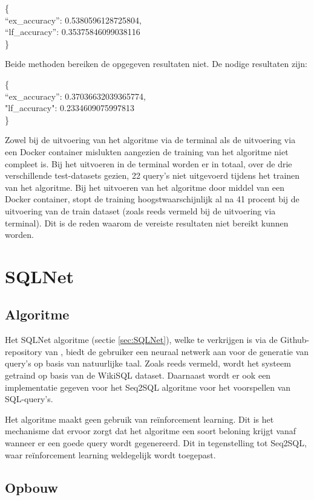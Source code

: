 \{ \\
“ex\_accuracy”: 0.5380596128725804, \\
“lf\_accuracy”: 0.35375846099038116 \\
\}

Beide methoden bereiken de opgegeven resultaten niet. De nodige resultaten zijn:

\{ \\
“ex\_accuracy”: 0.37036632039365774, \\
"lf\_accuracy": 0.2334609075997813 \\
\}

Zowel bij de uitvoering van het algoritme via de terminal als de uitvoering via een Docker container mislukten aangezien de training van het algoritme niet compleet is. Bij het uitvoeren in de terminal worden er in totaal, over de drie verschillende test-datasets gezien, 22 query's niet uitgevoerd tijdens het trainen van het algoritme. Bij het uitvoeren van het algoritme door middel van een Docker container, stopt de training hoogstwaarschijnlijk al na 41 procent bij de uitvoering van de train dataset (zoals reeds vermeld bij de uitvoering via terminal). Dit is de reden waarom de vereiste resultaten niet bereikt kunnen worden.  

\section{SQLNet}
\label{sec:sqlnet}

\subsection{Algoritme}

Het SQLNet algoritme (sectie \ref{sec:SQLNet}), welke te verkrijgen is via de Github-repository van \textcite{sqlnet}, biedt de gebruiker een neuraal netwerk aan voor de generatie van query's op basis van natuurlijke taal. Zoals reeds vermeld, wordt het systeem getraind op basis van de WikiSQL dataset. Daarnaast wordt er ook een implementatie gegeven voor het Seq2SQL algoritme voor het voorspellen van SQL-query's.

Het algoritme maakt geen gebruik van reïnforcement learning. Dit is het mechanisme dat ervoor zorgt dat het algoritme een soort beloning krijgt vanaf wanneer er een goede query wordt gegenereerd. Dit in tegenstelling tot Seq2SQL, waar reïnforcement learning weldegelijk wordt toegepast.

\subsection{Opbouw}

